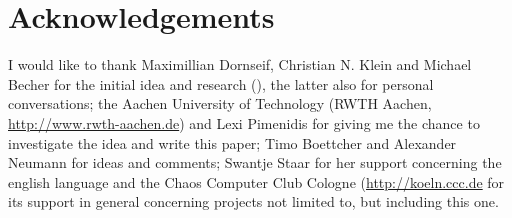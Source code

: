 %
%

\section{Acknowledgements}

I would like to thank Maximillian Dornseif, Christian N. Klein and Michael
Becher for the initial idea and research (\cite{cansecwest_firewire:2005}), the
latter also for personal conversations; the Aachen University of Technology
(RWTH Aachen, \href{http://www.rwth-aachen.de}{http://www.rwth-aachen.de}) and
Lexi Pimenidis for giving me the chance to investigate the idea and write this
paper; Timo Boettcher and Alexander Neumann for ideas and comments; Swantje
Staar for her support concerning the english language and the Chaos Computer
Club Cologne (\href{http://koeln.ccc.de}{http://koeln.ccc.de} for its support in
general concerning projects not limited to, but including this one.

